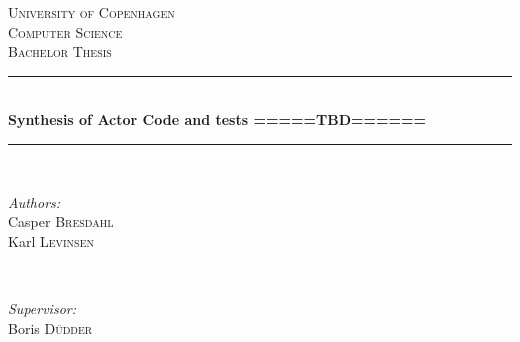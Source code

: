 \documentclass{article}                                                        %
\begin{document}
\begin{titlepage}

\newcommand{\HRule}{\rule{\linewidth}{0.5mm}} %

\begin{center}
 

\textsc{\LARGE University of Copenhagen}\\[1.5cm] %
\textsc{\Large Computer Science}\\[0.5cm] %
\textsc{\large Bachelor Thesis}\\[0.5cm] %


\HRule \\[0.4cm]
{ \huge \bfseries Synthesis of Actor Code and tests =====TBD======}\\[0.4cm] %
\HRule \\[1.5cm]
 

\begin{minipage}{0.4\textwidth}
\begin{flushleft} \large
\emph{Authors:}\\ 
Casper \textsc{Bresdahl} \\
Karl \textsc{Levinsen}
\end{flushleft}
\end{minipage}
~
\begin{minipage}{0.4\textwidth}
\begin{flushright} \large
\emph{Supervisor:} \\
Boris \textsc{Düdder}\\
\hfill
\end{flushright}
\end{minipage}\\[2cm]


\end{center}
\end{titlepage}
\end{document}
